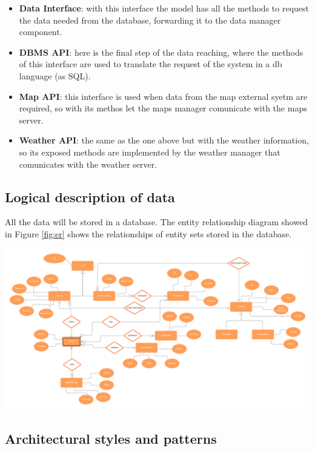 \begin{itemize}
    \item \textbf{Data Interface}: with this interface the model has all the methods to request the data needed from the database, forwarding it to the data manager component. 
    \item \textbf{DBMS API}: here is the final step of the data reaching, where the methods of this interface are used to translate the request of the system in a db language (as SQL).
    \item \textbf{Map API}: this interface is used when data from the map external syetm are required, so with its methos let the maps manager comunicate with the maps server.
    \item \textbf{Weather API}: the same as the one above but with the weather information, so its exposed methods are implemented by the weather manager that comunicates with the weather server.
\end{itemize}
\subsection{Logical description of data}
All the data will be stored in a database. 
The entity relationship diagram showed in Figure \ref{fig:er} shows the relationships of entity sets stored in the database.


\begin{adjustbox}{angle=90,center,caption=\emph{Interfaces} view,nofloat=figure}
    \includegraphics[width=1.6\linewidth]{images/ER diagram.png}
    \label{fig:er}
\end{adjustbox}

\subsection{Architectural styles and patterns}

